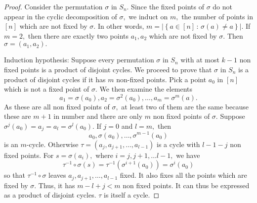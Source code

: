 \begin{proof}
	Consider the permutation $\sigma$ in $S_n.$
Since the fixed points of $\sigma$ do not appear in the cyclic decomposition of $\sigma,$
we induct on $m,$ the number of points in $ \left[ n \right] $ which are not fixed by $ \sigma.$
In other words, $ m = \lvert \left\{ a \in \left[ n \right] \, : \, \sigma(a) \not = a \right\}  \rvert .$
If $ m = 2,$ then there are exactly two points $a_1, a_2$ which are not fixed by $ \sigma.$
Then $\sigma = (a_1, a_2).$

Induction hypothesis:
Suppose every permutation $\sigma$ in $S_n$ with at most $k-1$ non fixed points
is a product of disjoint cycles.
We proceed to prove that $\sigma$ in $S_n$ is a product of disjoint cycles
if it has $m$ non-fixed points.
Pick a point $a_0$ in $ \left[ n \right] $ which is not a fixed point of $\sigma.$
We then examine the elements $$a_1 = \sigma(a_0), a_2 = \sigma^2(a_0), \dotsc, a_m = \sigma^m(a).$$
As these are all non fixed points of $\sigma,$ at least two of them are the same 
because these are $m+1$ in number and there are only $m$ non fixed points of 
$\sigma.$ Suppose $\sigma^j(a_0) = a_j = a_l = \sigma^l(a_0).$
If $j=0$ and $l=m,$ then 
$$ a_0, \sigma(a_0), \dotsc, \sigma^{m-1}(a_0) $$
is an $m$\nobreakdash-cycle.
Otherwise $ \tau = (a_j, a _{j+1}, \dotsc, a _{l-1})$ is a cycle with $l-1-j$
non fixed points.
For $s = \sigma(a_i),$ where $i=j, j+1, \dotsc l-1,$ we have
$$ \tau^{-1} \circ \sigma (s) = \tau^{-1}(\sigma^{i+1}(a_0)) = \sigma^i(a_0)$$
so that $\tau^{-1} \circ \sigma$ leaves $a_j, a _{j+1}, \dotsc, a_{l-1}$ fixed.
It also fixes all the points which are fixed by $ \sigma.$
Thus, it has $m - l + j < m $ non fixed points.
It can thus be expressed as a product of disjoint cycles.
$\tau$ is itself a cycle.
\end{proof}

